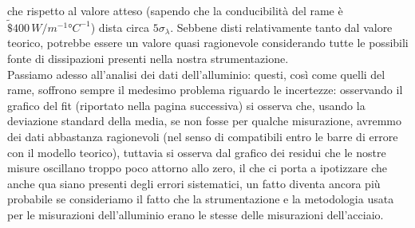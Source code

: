 \documentclass{article}
\begin{document}
\noindent che rispetto al valore atteso (sapendo che la conducibilità del rame è $ \tilde \$400 \, \unit{W/m^{-1}°C^{-1}}$) dista circa $5\sigma_{\lambda}$. Sebbene disti relativamente tanto dal valore teorico, potrebbe essere un valore quasi ragionevole considerando tutte le possibili fonte di dissipazioni presenti nella nostra strumentazione. \\
Passiamo adesso all'analisi dei dati dell'alluminio: questi, così come quelli del rame, soffrono sempre il medesimo problema riguardo le incertezze: osservando il grafico del fit (riportato nella pagina successiva) si osserva che, usando la deviazione standard della media, se non fosse per qualche misurazione, avremmo dei dati abbastanza ragionevoli (nel senso di compatibili entro le barre di errore con il modello teorico), tuttavia si osserva dal grafico dei residui che le nostre misure oscillano troppo poco attorno allo zero, il che ci porta a ipotizzare che anche qua siano presenti degli errori sistematici, un fatto diventa ancora più probabile se consideriamo il fatto che la strumentazione e la metodologia usata per le misurazioni dell'alluminio erano le stesse delle misurazioni dell'acciaio.
\end{document}
